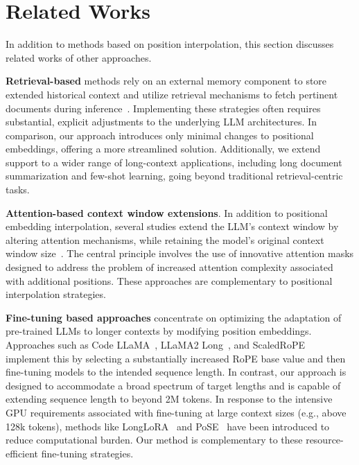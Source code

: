 \section{Related Works}

In addition to methods based on position interpolation, this section discusses related works of other approaches. 

\textbf{Retrieval-based} methods rely on an external memory component to store extended historical context and utilize retrieval mechanisms to fetch pertinent documents during inference~\cite{longllama,wang2023augmenting,borgeaud2022improving}. Implementing these strategies often requires substantial, explicit adjustments to the underlying LLM architectures. In comparison, our approach introduces only minimal changes to positional embeddings, offering a more streamlined solution. Additionally, we extend support to a wider range of long-context applications, including long document summarization and few-shot learning, going beyond traditional retrieval-centric tasks.

\textbf{Attention-based context window extensions}. In addition to positional embedding interpolation, several studies extend the LLM's context window by altering attention mechanisms, while retaining the model's original context window size~\cite{han2023lminfinite, streamingllm,parallelwindow}. The central principle involves the use of innovative attention masks designed to address the problem of increased attention complexity associated with additional positions. These approaches are complementary to positional interpolation strategies.

\textbf{Fine-tuning based approaches} concentrate on optimizing the adaptation of pre-trained LLMs to longer contexts by modifying position embeddings. Approaches such as Code LLaMA~\cite{codellama}, LLaMA2 Long~\cite{xiong2023effective}, and ScaledRoPE~\cite{liu2023scaling} implement this by selecting a substantially increased RoPE base value and then fine-tuning models to the intended sequence length. In contrast, our approach is designed to accommodate a broad spectrum of target lengths and is capable of extending sequence length to beyond 2M tokens. In response to the intensive GPU requirements associated with fine-tuning at large context sizes (e.g., above 128k tokens), methods like LongLoRA~\cite{longlora} and PoSE~\cite{zhu2023pose} have been introduced to reduce computational burden. Our method is complementary to these resource-efficient fine-tuning strategies.


